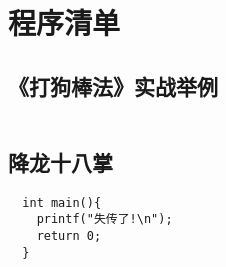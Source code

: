 \chapter{程序清单}
\singlespacing

\section{《打狗棒法》实战举例}
\label{sec:dog}

\inputminted[fontsize=\small,
  linenos=true,numbersep=2pt,
  frame=leftline,framesep=3pt,rulecolor=\color{lightgray},
  xleftmargin=10pt
  ]{c}{hello.c}

\section{降龙十八掌}
\label{sec:dragon}

\begin{verbatim}
  int main(){
    printf("失传了!\n");
    return 0;
  }
\end{verbatim}

